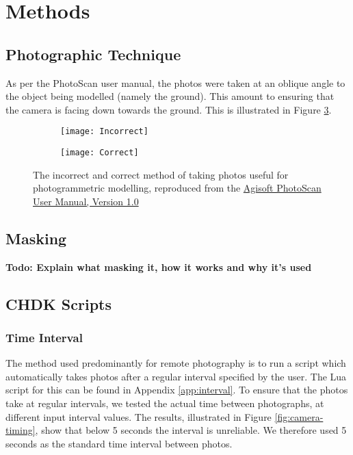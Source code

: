 \section{Methods}

\subsection{Photographic Technique}

As per the PhotoScan user
manual, the
photos were taken at an oblique angle to the object being modelled (namely the
ground). This amount to ensuring that the camera is facing down towards the
ground. This is illustrated in Figure \ref{img:photographic-method}.

\begin{figure}[H]
    \centering
    \begin{subfigure}[b]{0.49\textwidth}
        \texttt{[image: Incorrect]}
        \label{img:incorrect}
    \end{subfigure}
    \begin{subfigure}[b]{0.49\textwidth}
        \texttt{[image: Correct]}
        \label{img:correct}
    \end{subfigure}
    \caption{The incorrect and correct method of taking photos useful for
        photogrammetric modelling, reproduced from the
        \href{http://downloads.agisoft.ru/pdf/photoscan-pro\_1\_0\_0\_en.pdf}{Agisoft
        PhotoScan User Manual, Version 1.0}}
    \label{img:photographic-method}
\end{figure}

\subsection{Masking}
\label{sec:methods/masking}

\textbf{Todo: Explain what masking it, how it works and why it's used}

\subsection{CHDK Scripts}

\subsubsection{Time Interval}

The method used predominantly for remote photography is to run a script which
automatically takes photos after a regular interval specified by the user. The
Lua script for this can be found in Appendix \ref{app:interval}. To ensure that
the photos take at regular intervals, we tested the actual time between
photographs, at different input interval values. The results, illustrated in
Figure \ref{fig:camera-timing}, show that below 5 seconds the interval is
unreliable. We therefore used 5 seconds as the standard time interval between
photos.

